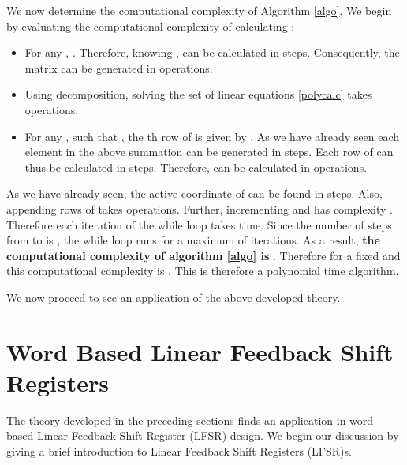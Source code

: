 \documentclass[letterpaper, 12 pt]{article}  \usepackage{amssymb}
\begin{document}
We now determine the computational complexity of Algorithm
\ref{algo}. We begin by evaluating the computational complexity of calculating
: 

\begin{itemize}
 \item For any , .
Therefore, knowing ,  can
be calculated in  steps. Consequently, the matrix  can be
generated in  operations.
\item Using decomposition, solving the set of linear equations
\eqref{polycalc} takes  operations.
\item For any , such that , the th
row of  is given by . As we have already seen each element in
the above summation can be generated in  steps. Each row of
 can thus be calculated in  steps. Therefore, 
 can be calculated in  operations.
\end{itemize}
As we have already seen, the active coordinate of  can be found in 
steps. Also, appending   rows of  takes  operations. Further,
incrementing  and  has complexity . Therefore each iteration of the
while loop takes  time.  Since the number of steps from  to
 is , the while loop runs for a maximum of  iterations.
 As a result, {\bf the computational complexity of algorithm \ref{algo} is
}.
 Therefore for a fixed  and  this computational complexity is . This is therefore a polynomial time algorithm.    

 We now proceed to see an application of the above developed theory.

    
\section{Word Based Linear Feedback Shift Registers}
The theory developed in the preceding sections finds an application in word
based Linear Feedback Shift Register (LFSR) design. We begin our discussion by
giving a brief introduction to Linear Feedback Shift
Registers (LFSR)s. 
\end{document}
